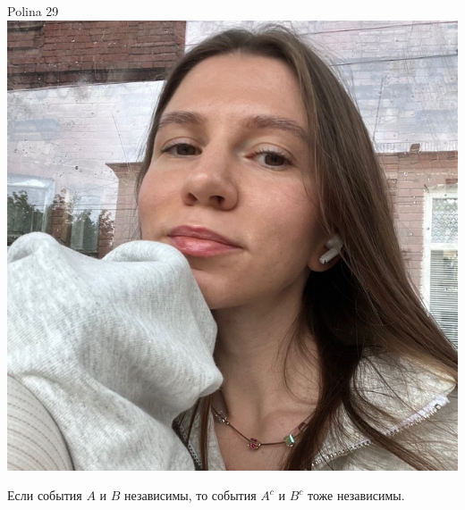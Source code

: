 \documentclass[12pt]{article}
\begin{document}
\newpage

%
\begin{minipage}{0.45\textwidth}
\begin{tinderf}{Polina 29}
\includegraphics[width=\textwidth]{tinder-photo/polina.jpg}

  

\begin{mybox}
Если события  $A$ и $B$ независимы, то события $A^c$ и $B^c$ тоже независимы.
\end{mybox}
\end{tinderf}
\end{minipage}
%
\end{document}
